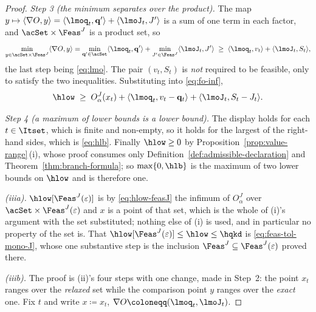 \begin{proof}
\emph{Step 3 (the minimum separates over the product).} The map
$y\mapsto\langle\nabla O,y\rangle
=\langle\lmoq_t,\mathbf q'\rangle+\langle\lmoJ_t,J'\rangle$ is a sum of
one term in each factor, and $\acSet\times\Feas^{J}$ is a product set, so
\begin{equation*}
  \min_{y\in\acSet\times\Feas^{J}}\langle\nabla O,y\rangle
  =\min_{\mathbf q'\in\acSet}\langle\lmoq_t,\mathbf q'\rangle
  +\min_{J'\in\Feas^{J}}\langle\lmoJ_t,J'\rangle
  \;\ge\;\langle\lmoq_t,v_t\rangle+\langle\lmoJ_t,S_t\rangle ,
\end{equation*}
the last step being \eqref{eq:lmo}. The pair $(v_t,S_t)$ is \emph{not}
required to be feasible, only to satisfy the two inequalities.
Substituting into \eqref{eq:fo-inf},
\begin{equation*}
  \hlow\;\ge\;O^{J}_{\alpha}(x_t)
  +\langle\lmoq_t,v_t-\mathbf q_t\rangle
  +\langle\lmoJ_t,S_t-J_t\rangle .
\end{equation*}

\emph{Step 4 (a maximum of lower bounds is a lower bound).} The display
holds for each $t\in\Itset$, which is finite and non-empty, so it holds
for the largest of the right-hand sides, which is \eqref{eq:hlb}. Finally
$\hlow\ge0$ by Proposition~\ref{prop:value-range}\,(i), whose proof
consumes only Definition~\ref{def:admissible-declaration} and
Theorem~\ref{thm:branch-formula}; so $\max\{0,\hlb\}$ is the maximum of
two lower bounds on $\hlow$ and is therefore one.

\emph{(iiia).} $\hlow[\Feas^{J}(\varepsilon)]$ is by \eqref{eq:hlow-feasJ}
the infimum of $O^{J}_{\alpha}$ over $\acSet\times\Feas^{J}(\varepsilon)$
and $x$ is a point of that set, which is the whole of (i)'s argument with
the set substituted; nothing else of (i) is used, and in particular no
property of the set is. That
$\hlow[\Feas^{J}(\varepsilon)]\le\hlow\le\hqkd$ is
\eqref{eq:feas-tol-mono-J}, whose one substantive step is the inclusion
$\Feas^{J}\subseteq\Feas^{J}(\varepsilon)$ proved there.

\emph{(iiib).} The proof is (ii)'s four steps with one change, made in
Step~2: the point $x_t$ ranges over the \emph{relaxed} set while the
comparison point $y$ ranges over the \emph{exact} one. Fix
$t$ and write $x\coloneqq x_t$, $\nabla O\coloneqq(\lmoq_t,\lmoJ_t)$.


\end{proof}
